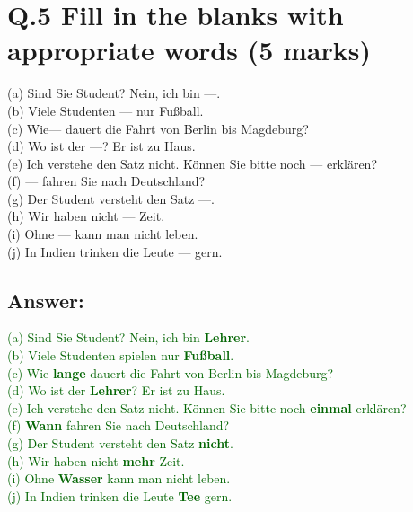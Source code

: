 \documentclass[a4paper,12pt]{article}
\begin{document}
\vspace{1cm}

\section*{Q.5 Fill in the blanks with appropriate words (5 marks)}

(a) Sind Sie Student? Nein, ich bin ---.\\
(b) Viele Studenten --- nur  Fußball.\\
(c) Wie--- dauert die Fahrt von Berlin bis Magdeburg?\\
(d) Wo ist der ---? Er ist zu Haus.\\
(e) Ich verstehe den Satz nicht. Können Sie bitte noch --- erklären?\\
(f) --- fahren Sie nach Deutschland?\\
(g) Der Student versteht den Satz ---.\\
(h) Wir haben nicht --- Zeit.\\
(i) Ohne --- kann man nicht leben.\\
(j) In Indien trinken die Leute --- gern.

\subsection*{Answer:}
\textcolor{darkgreen}{(a) Sind Sie Student? Nein, ich bin \textbf{Lehrer}.\\}
\textcolor{darkgreen}{(b) Viele Studenten spielen nur \textbf{Fußball}.\\}
\textcolor{darkgreen}{(c) Wie \textbf{lange} dauert die Fahrt von Berlin bis Magdeburg?\\}
\textcolor{darkgreen}{(d) Wo ist der \textbf{Lehrer}? Er ist zu Haus.\\}
\textcolor{darkgreen}{(e) Ich verstehe den Satz nicht. Können Sie bitte noch \textbf{einmal} erklären?\\}
\textcolor{darkgreen}{(f) \textbf{Wann} fahren Sie nach Deutschland?\\}
\textcolor{darkgreen}{(g) Der Student versteht den Satz \textbf{nicht}.\\}
\textcolor{darkgreen}{(h) Wir haben nicht \textbf{mehr} Zeit.\\}
\textcolor{darkgreen}{(i) Ohne \textbf{Wasser} kann man nicht leben.\\}
\textcolor{darkgreen}{(j) In Indien trinken die Leute \textbf{Tee} gern.\\}
\
\end{document}
